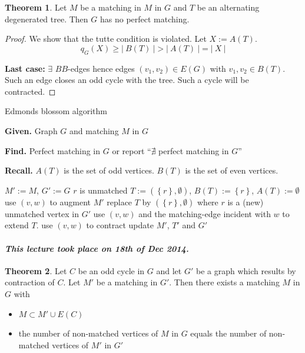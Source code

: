 \documentclass[a4paper]{article}
\theoremstyle{definition}
\newtheorem{theorem}{Theorem}
\newcommand{\card}[1]{\left|\:\!#1\:\!\right|}
\newcommand{\set}[1]{\left\{#1\right\}}
\newcommand{\given}[1]{\textbf{Given.} #1\par}
\newcommand{\find}[1]{\textbf{Find.} #1\par}
\newcommand{\dateref}[1]{\paragraph{\textit{This lecture took place on #1.}}}
\begin{document}
\begin{theorem}\label{proposition-6.7}
  Let $M$ be a matching in $M$ in $G$ and $T$ be an alternating degenerated tree.
  Then $G$ has no perfect matching.
\end{theorem}

\begin{proof}
  We show that the tutte condition is violated. Let $X := A(T)$.
  \[ q_G(X) \geq \card{B(T)} > \card{A(T)} = \card{X} \]

  \textbf{Last case:}
    $\exists$ $BB$-edges hence edges $(v_1, v_2) \in E(G)$ with $v_1, v_2 \in B(T)$.
    Such an edge closes an odd cycle with the tree. Such a cycle will be contracted.
\end{proof}

\begin{algorithm}
  \caption{Edmonds blossom algorithm}
  \label{edmonds-blossom-algo}
  \given{Graph $G$ and matching $M$ in $G$}
  \find{Perfect matching in $G$ or report ``$\nexists$ perfect matching in $G$''}
  \textbf{Recall.} $A(T)$ is the set of odd vertices. $B(T)$ is the set of even vertices. \par
\begin{algorithmic}[1]
  \State $M' := M$, $G' := G$
    \State {}
  \Else
    \State $r$ is unmatched
    \State $T := (\set{r}, \emptyset)$, $B(T) := \set{r}$, $A(T) := \emptyset$
  \EndIf
      \State use $(v, w)$ to augment $M'$
        \State {}
      \Else
        \State replace $T$ by $(\set{r}, \emptyset)$ where $r$ is a (new) unmatched vertex in $G'$
      \EndIf
      \State use $(v, w)$ and the matching-edge incident with $w$ to extend $T$.
      \State use $(v, w)$ to contract
      \State update $M'$, $T'$ and $G'$
    \EndIf
  \EndWhile
  \State {}
\end{algorithmic}
\end{algorithm}

\dateref{18th of Dec 2014}

\begin{theorem}\label{proposition-6.8}
  Let $C$ be an odd cycle in $G$ and let $G'$ be a graph which results by contraction of $C$.
  Let $M'$ be a matching in $G'$. Then there exists a matching $M$ in $G$ with
  \begin{itemize}
    \item $M \subset M' \cup E(C)$
    \item the number of non-matched vertices of $M$ in $G$ equals the number of non-matched vertices of $M'$ in $G'$
  \end{itemize}
\end{theorem}
\end{document}
